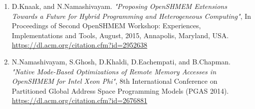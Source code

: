 \begin{enumerate}
\item D.Knaak, and N.Namashivayam.
      \textit{"Proposing OpenSHMEM Extensions Towards a Future for Hybrid
      Programming and Heterogeneous Computing"}, In Proceedings of Second
      OpenSHMEM Workshop: Experiences, Implementations and Tools, August, 2015,
      Annapolis, Maryland, USA.\\
      \url{https://dl.acm.org/citation.cfm?id=2952638}
\item N.Namashivayam, S.Ghosh, D.Khaldi, D.Eachempati, and
      B.Chapman.
      \textit{"Native Mode-Based Optimizations of Remote Memory Accesses in
      OpenSHMEM for Intel Xeon Phi"}, 8th International Conference on Partitioned
      Global Address Space Programming Models (PGAS 2014).\\
      \url{https://dl.acm.org/citation.cfm?id=2676881}
\end{enumerate}


